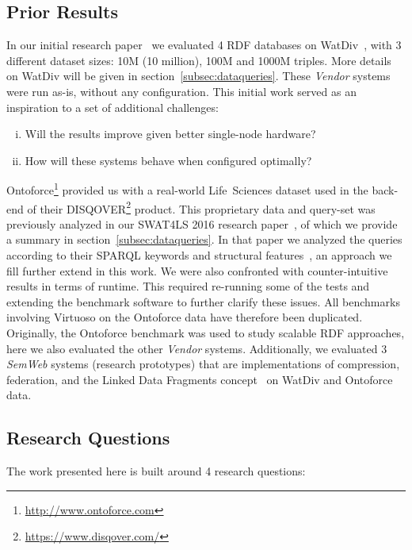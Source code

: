 \subsection{Prior Results}
In our initial research paper~\cite{de2016big} we evaluated 4 RDF databases on WatDiv~\cite{alucc2014diversified}, with 3 different dataset sizes: 10M (10 million), 100M and 1000M triples. More details on WatDiv will be given in section~\ref{subsec:dataqueries}. These \emph{Vendor} systems were run as-is, without any configuration. 
This initial work served as an inspiration to a set of additional challenges:
\begin{enumerate}[(i)]
\item Will the results improve given better single-node hardware?
\item How will these systems behave when configured optimally?
\end{enumerate}
Ontoforce\footnote{\scriptsize \url{http://www.ontoforce.com}} provided us with a real-world \mbox{Life Sciences} dataset used in the back-end of their \mbox{DISQOVER}\footnote{\scriptsize \url{https://www.disqover.com/}} product. This proprietary data and query-set was previously analyzed in our SWAT4LS 2016 research paper~\cite{dewitte_swat4ls_2016}, of which we provide a summary in section~\ref{subsec:dataqueries}.
In that paper we analyzed the queries according to their SPARQL keywords and structural features~\cite{DBLP:journals/corr/abs-1103-5043}, an approach we fill further extend in this work. 
We were also confronted with counter-intuitive results in terms of runtime. This required re-running some of the tests and extending the benchmark software to further clarify these issues. All benchmarks involving Virtuoso on the Ontoforce data have therefore been duplicated.
Originally, the Ontoforce benchmark was used to study scalable RDF approaches, here we also evaluated the other \emph{Vendor} systems. Additionally, we evaluated 3 \emph{SemWeb} systems (research prototypes) that are implementations of compression, federation, and the Linked Data Fragments concept~\cite{DBLP:conf/semweb/VerborghHMHVSCCMW14} on WatDiv and Ontoforce data.

\subsection{Research Questions}

The work presented here is built around 4 research questions:

